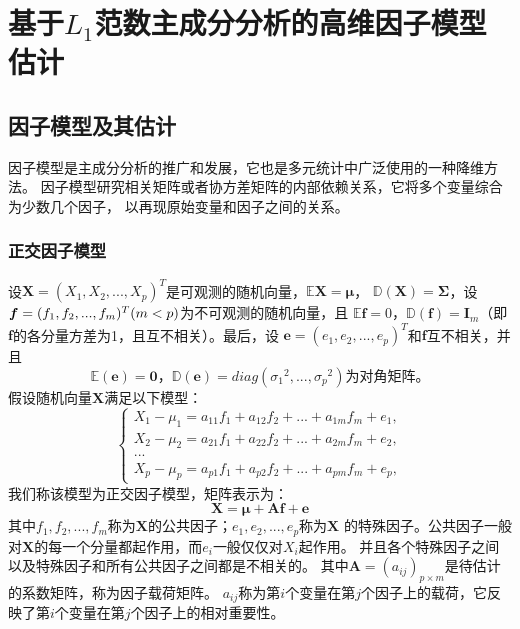 \section{基于$L_1$范数主成分分析的高维因子模型估计}\label{chapter2}

\subsection{因子模型及其估计}
因子模型是主成分分析的推广和发展，它也是多元统计中广泛使用的一种降维方法。
因子模型研究相关矩阵或者协方差矩阵的内部依赖关系，它将多个变量综合为少数几个因子，
以再现原始变量和因子之间的关系。

\subsubsection{正交因子模型}

设$\bm{X} = (X_1, X_2, ..., X_p)^T$是可观测的随机向量，$\mathbb{E}\bm{X} = \bm{\mu}$，
$\mathbb{D}(\bm{X}) = \bm{\Sigma}$，设$\bm{f} = (f_1, f_2, ..., f_m)^T\\ (m <p)$为不可观测的随机向量，且
$\mathbb{E}\bm{f} = 0$，$\mathbb{D}(\bm{f}) = \bm{I}_m$（即$\bm{f}$的各分量方差为1，且互不相关）。最后，设
$\bm{e} = (e_1, e_2, ..., e_p)^T$和$\bm{f}$互不相关，并且
$$
    \mathbb{E}(\bm{e}) = \bm{0}\mbox{，}\mathbb{D}(\bm{e}) = diag({\sigma _1}^2, ..., {\sigma _p}^2)
    \mbox{为对角矩阵。}
$$
假设随机向量$\bm{X}$满足以下模型：
\begin{equation*}
\left\{
\begin{array}{clr}
    X_1 - \mu_1 = a_{11}f_1 + a_{12}f_2 + ... + a_{1m}f_m + e_1, \\
    X_2 - \mu_2 = a_{21}f_1 + a_{22}f_2 + ... + a_{2m}f_m + e_2, \\
    ... \\
    X_p - \mu_p = a_{p1}f_1 + a_{p2}f_2 + ... + a_{pm}f_m + e_p,
\end{array}
\right.
\end{equation*}
我们称该模型为正交因子模型，矩阵表示为：
\begin{equation}
    \bm{X} = \bm{\mu} + \bm{A}\bm{f} + \bm{e}
\end{equation}
其中$f_1, f_2, ..., f_m$称为$\bm{X}$的公共因子；$e_1, e_2, ..., e_p$称为$\bm{X}$
的特殊因子。公共因子一般对$\bm{X}$的每一个分量都起作用，而$e_i$一般仅仅对$X_i$起作用。
并且各个特殊因子之间以及特殊因子和所有公共因子之间都是不相关的。
其中$\bm{A} = (a_{ij})_{p \times m}$是待估计的系数矩阵，称为因子载荷矩阵。
$a_{ij}$称为第$i$个变量在第$j$个因子上的载荷，它反映了第$i$个变量在第$j$个因子上的相对重要性。

